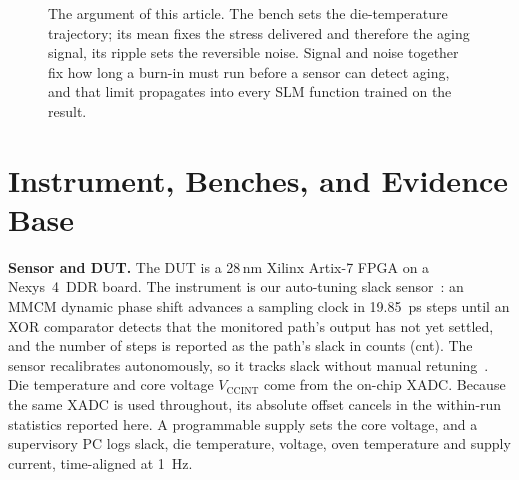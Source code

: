 \documentclass[10pt,twocolumn]{article}
\newcommand{\Tmin}{T_{\min}}
\newcommand{\tint}{\tau_{\mathrm{int}}}
\begin{document}
\begin{figure}[!t]
\centering
{}
\caption{The argument of this article. The bench sets the die-temperature trajectory; its mean fixes the stress delivered and therefore the aging signal, its ripple sets the reversible noise. Signal and noise together fix how long a burn-in must run before a sensor can detect aging, and that limit propagates into every SLM function trained on the result.}
\label{fig:chain}
\end{figure}

\section{Instrument, Benches, and Evidence Base}

\textbf{Sensor and DUT.} The DUT is a 28\,nm Xilinx Artix-7 FPGA on a Nexys~4~DDR board. The instrument is our auto-tuning slack sensor~\cite{sbcci25}: an MMCM dynamic phase shift advances a sampling clock in \SI{19.85}{ps} steps until an XOR comparator detects that the monitored path's output has not yet settled, and the number of steps is reported as the path's slack in counts (cnt). The sensor recalibrates autonomously, so it tracks slack without manual retuning~\cite{sbcci25}. Die temperature and core voltage $V_{\mathrm{CCINT}}$ come from the on-chip XADC. Because the same XADC is used throughout, its absolute offset cancels in the within-run statistics reported here. A programmable supply sets the core voltage, and a supervisory PC logs slack, die temperature, voltage, oven temperature and supply current, time-aligned at \SI{1}{Hz}.
\end{document}
